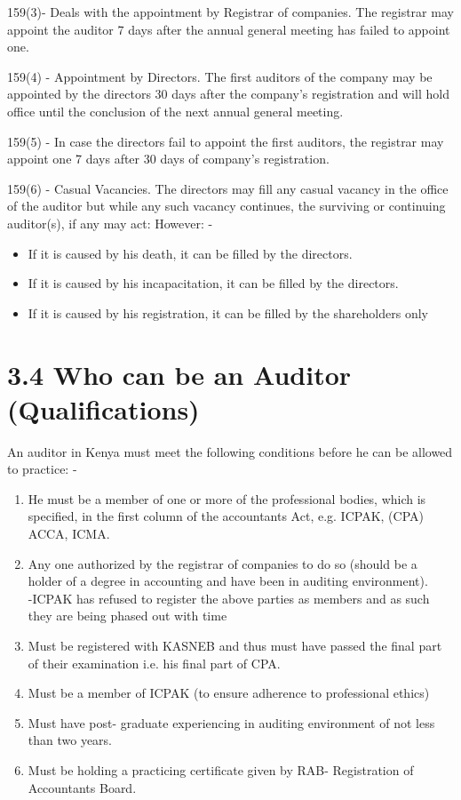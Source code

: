 \documentclass[10pt]{article}
\begin{document}
159(3)- Deals with the appointment by Registrar of companies. The registrar may appoint the auditor 7 days after the annual general meeting has failed to appoint one.

159(4) - Appointment by Directors. The first auditors of the company may be appointed by the directors 30 days after the company's registration and will hold office until the conclusion of the next annual general meeting.

159(5) - In case the directors fail to appoint the first auditors, the registrar may appoint one 7 days after 30 days of company's registration.

159(6) - Casual Vacancies. The directors may fill any casual vacancy in the office of the auditor but while any such vacancy continues, the surviving or continuing auditor(s), if any may act: However: -

\begin{itemize}
  \item If it is caused by his death, it can be filled by the directors.
  \item If it is caused by his incapacitation, it can be filled by the directors.
  \item If it is caused by his registration, it can be filled by the shareholders only
\end{itemize}

\section*{3.4 Who can be an Auditor (Qualifications)}
An auditor in Kenya must meet the following conditions before he can be allowed to practice: -

\begin{enumerate}
  \item He must be a member of one or more of the professional bodies, which is specified, in the first column of the accountants Act, e.g. ICPAK, (CPA) ACCA, ICMA.
  \item Any one authorized by the registrar of companies to do so (should be a holder of a degree in accounting and have been in auditing environment).\\
-ICPAK has refused to register the above parties as members and as such they are being phased out with time
  \item Must be registered with KASNEB and thus must have passed the final part of their examination i.e. his final part of CPA.
  \item Must be a member of ICPAK (to ensure adherence to professional ethics)
  \item Must have post- graduate experiencing in auditing environment of not less than two years.
  \item Must be holding a practicing certificate given by RAB- Registration of Accountants Board.
\end{enumerate}
\end{document}
